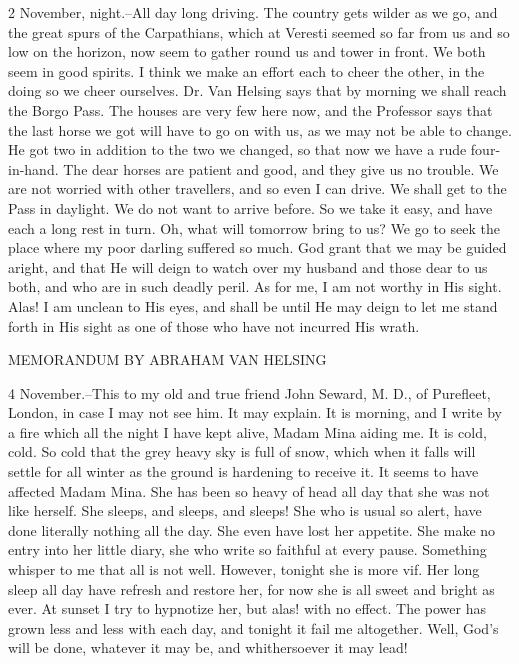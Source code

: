 2 November, night.--All day long driving. The country gets wilder as we go, and the great spurs of the Carpathians, which at Veresti seemed so far from us and so low on the horizon, now seem to gather round us and tower in front. We both seem in good spirits. I think we make an effort each to cheer the other, in the doing so we cheer ourselves. Dr. Van Helsing says that by morning we shall reach the Borgo Pass. The houses are very few here now, and the Professor says that the last horse we got will have to go on with us, as we may not be able to change. He got two in addition to the two we changed, so that now we have a rude four-in-hand. The dear horses are patient and good, and they give us no trouble. We are not worried with other travellers, and so even I can drive. We shall get to the Pass in daylight. We do not want to arrive before. So we take it easy, and have each a long rest in turn. Oh, what will tomorrow bring to us? We go to seek the place where my poor darling suffered so much. God grant that we may be guided aright, and that He will deign to watch over my husband and those dear to us both, and who are in such deadly peril. As for me, I am not worthy in His sight. Alas! I am unclean to His eyes, and shall be until He may deign to let me stand forth in His sight as one of those who have not incurred His wrath. 

MEMORANDUM BY ABRAHAM VAN HELSING 

4 November.--This to my old and true friend John Seward, M. D., of Purefleet, London, in case I may not see him. It may explain. It is morning, and I write by a fire which all the night I have kept alive, Madam Mina aiding me. It is cold, cold. So cold that the grey heavy sky is full of snow, which when it falls will settle for all winter as the ground is hardening to receive it. It seems to have affected Madam Mina. She has been so heavy of head all day that she was not like herself. She sleeps, and sleeps, and sleeps! She who is usual so alert, have done literally nothing all the day. She even have lost her appetite. She make no entry into her little diary, she who write so faithful at every pause. Something whisper to me that all is not well. However, tonight she is more vif. Her long sleep all day have refresh and restore her, for now she is all sweet and bright as ever. At sunset I try to hypnotize her, but alas! with no effect. The power has grown less and less with each day, and tonight it fail me altogether. Well, God's will be done, whatever it may be, and whithersoever it may lead! 

